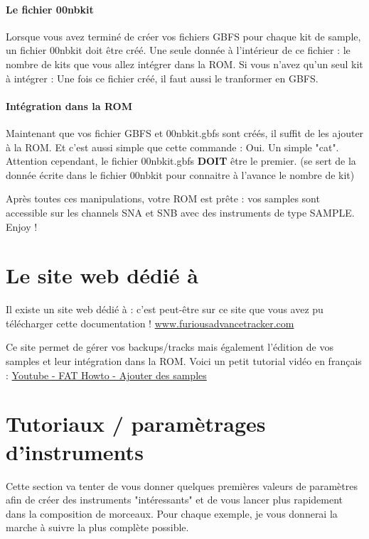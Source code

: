 \documentclass[12pt,a4paper]{article}
\begin{document}
  \paragraph{Le fichier 00nbkit} Lorsque vous avez terminé de créer vos fichiers GBFS pour chaque kit de sample, un fichier 00nbkit doit être créé. Une seule donnée à l'intérieur de ce fichier : le nombre de kits que vous allez intégrer dans la ROM. Si vous n'avez qu'un seul kit à intégrer :
  Une fois ce fichier créé, il faut aussi le tranformer en GBFS.

  \paragraph{Intégration dans la ROM} Maintenant que vos fichier GBFS et 00nbkit.gbfs sont créés, il suffit de les ajouter à la ROM. Et c'est aussi simple que cette commande :
  Oui. Un simple "cat". Attention cependant, le fichier 00nbkit.gbfs {\bf DOIT} être le premier. (\FAT se sert de la donnée écrite dans le fichier 00nbkit pour connaitre à l'avance le nombre de kit)\medskip

  Après toutes ces manipulations, votre ROM est prête : vos samples sont accessible sur les channels SNA et SNB avec des instruments de type SAMPLE. Enjoy !

  \section{Le site web dédié à \FAT}

  Il existe un site web dédié à \FAT : c'est peut-être sur ce site que vous avez pu télécharger cette documentation ! \href{http://www.furiousadvancetracker.com}{www.furiousadvancetracker.com}\medskip

  Ce site permet de gérer vos backups/tracks mais également l'édition de vos samples et leur intégration dans la ROM. Voici un petit tutorial vidéo en français : \href{https://www.youtube.com/watch?v=a9rPzz-6Mgg}{Youtube - FAT Howto - Ajouter des samples}

  \section{Tutoriaux / paramètrages d'instruments}

  Cette section va tenter de vous donner quelques premières valeurs de paramètres afin de créer des instruments "intéressants" et de vous lancer plus rapidement dans la composition de morceaux. Pour chaque exemple, je vous donnerai la marche à suivre la plus complète possible.
\end{document}
